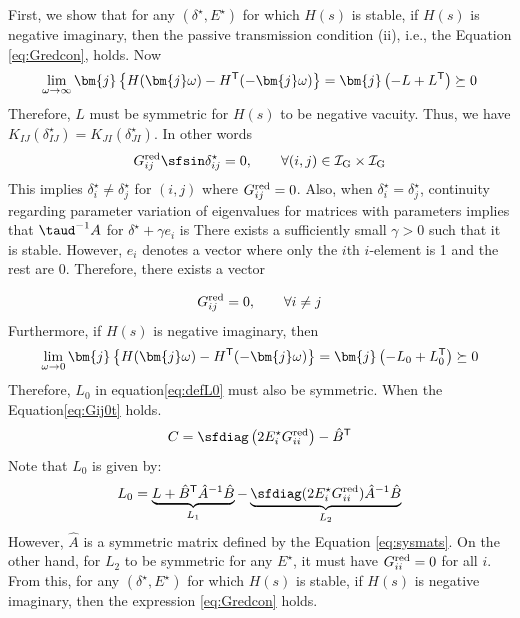 \documentclass[tombow,dvipdfmx]{corona-a5-1.1}
\begin{document}
\begin{証明}
First, we show that for any $(\delta^{\star},E^{\star})$ for which $H(s)$ is stable, if $H(s)$ is negative imaginary, then the passive transmission condition (ii), i.e., the Equation \ref{eq:Gredcon}, holds.
Now
\[
\lim_{\omega \rightarrow \infty} \bm{j}
\left\{
H(\bm{j}\omega)-H^{\sf T}(-\bm{j}\omega)
\right\}
=\bm{j}
\left(
-L+L^{\sf T}
\right) \succeq 0
\]
Therefore, $L$ must be symmetric for $H(s)$ to be negative vacuity.
Thus, we have $K_{IJ}(\delta_{IJ}^{\star}) = K_{JI}(\delta_{JI}^{\star})$.
In other words
\[
G^{\rm red}_{ij} \sfsin \delta_{ij}^{\star} = 0 ,\qquad
\forall (i, j) \in \mathcal{I}_{\rm G} \times \mathcal{I}_{\rm G}
\]
This implies $\delta_{i}^{\star}\neq \delta_{j}^{\star}$ for $(i,j)$ where $G^{\rm red}_{ij}=0$.
Also, when $\delta_{i}^{\star}= \delta_{j}^{\star}$, continuity regarding parameter variation of eigenvalues for matrices with parameters implies that $\taud^{-1}A$ for $\delta^{\star}+\gamma e_i$ is There exists a sufficiently small $\gamma>0$ such that it is stable.
However, $e_i$ denotes a vector where only the $i$th $i$-element is 1 and the rest are 0.
Therefore, there exists a vector

\begin{align}\label{eq:Gij0t}
G^{\rm red}_{ij}=0, \qquad
\forall i\neq j
\end{align}
Furthermore, if $H(s)$ is negative imaginary, then
\[
\lim_{\omega \rightarrow 0} \bm{j}
\left\{
H(\bm{j}\omega)-H^{\sf T}(-\bm{j}\omega)
\right\}
=\bm{j}
\left(
-L_0+L_0^{\sf T}
\right) \succeq 0
\]
Therefore, $L_0$ in equation\ref{eq:defL0} must also be symmetric.
When the Equation\ref{eq:Gij0t} holds.
\[
C = \sfdiag \left(
2E_i^{\star} G^{\rm red}_{ii}
\right)  - \hat{B}^{\sf T}
\]
Note that $L_0$ is given by:
\[
L_0 = \underbrace{ L + \hat{B}^{\sf T} \hat{A}^{-1} \hat{B} }_{L_1}
-
\underbrace{ \sfdiag (
2 E_i^{\star} G^{\rm red}_{ii}
) \hat{A}^{-1} \hat{B}
}_{L_2}
\]
However, $\hat{A}$ is a symmetric matrix defined by the Equation \ref{eq:sysmats}.
On the other hand, for $L_2$ to be symmetric for any $E^{\star}$, it must have $G^{\rm red}_{ii}=0$ for all $i$.
From this, for any $(\delta^{\star},E^{\star})$ for which $H(s)$ is stable, if $H(s)$ is negative imaginary, then the expression \ref{eq:Gredcon} holds.


\end{証明}
\end{document}
